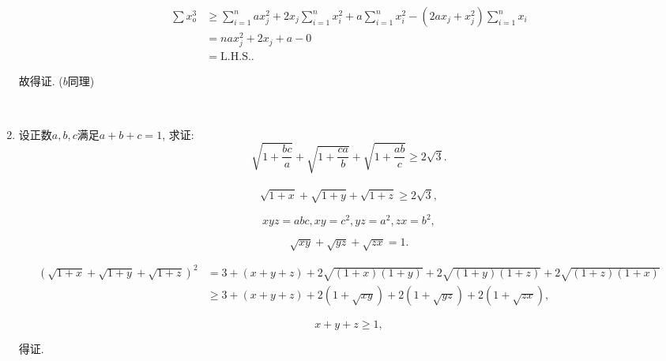\documentclass[8pt]{article}
\begin{document}
\begin{enumerate}
			\begin{align*}
				\sum x_o^3 &\geq \sum_{i=1}^{n} a x_j^2 + 2 x_j \sum_{i=1}^{n} x_i^2 + a\sum_{i=1}^{n} x_i^2 - (2ax_j + x_j^2)\sum_{i=1}^{n} x_i\\
				&= nax_j^2 + 2x_j + a - 0\\
				&= \mathrm{L.H.S.}.
			\end{align*}

			故得证. ($b$同理)

		~\\

		\item 设正数$a, b, c$满足$a+b+c=1$, 求证: $$\sqrt{1+\frac{bc}{a}} + \sqrt{1+\frac{ca}{b}} + \sqrt{1+\frac{ab}{c}} \geq 2\sqrt{3}.$$
			~\\

			$$\sqrt{1+x}+\sqrt{1+y}+\sqrt{1+z}\geq 2\sqrt{3},$$

			$$xyz=abc, xy=c^2, yz=a^2, zx=b^2,$$

			$$\sqrt{xy}+\sqrt{yz}+\sqrt{zx}=1.$$

			\begin{align*}
				(\sqrt{1+x} + \sqrt{1+y} + \sqrt{1+z})^2 &= 3+(x+y+z) + 2\sqrt{(1+x)(1+y)} + 2\sqrt{(1+y)(1+z)} + 2\sqrt{(1+z)(1+x)}\\
				&\geq 3+(x+y+z)+2(1+\sqrt{xy})+2(1+\sqrt{yz})+2(1+\sqrt{zx}),
			\end{align*}

			$$x+y+z\geq 1,$$

			得证.

	\end{enumerate}
\end{document}

